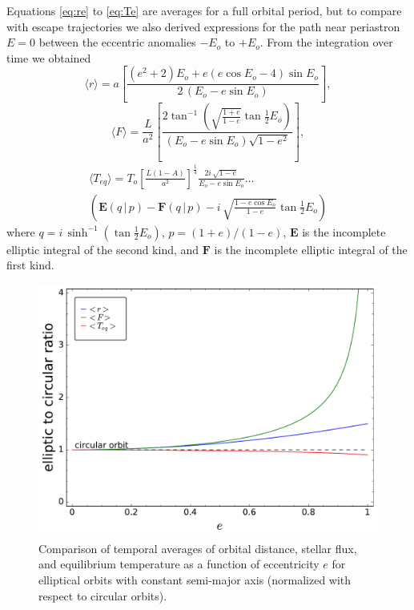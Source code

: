 \documentclass[a4paper,fleqn,usenatbib]{mnras}
\begin{document}
Equations \ref{eq:re} to \ref{eq:Te} are averages for a full orbital period, but to compare with escape trajectories we also derived expressions for the path near periastron $E=0$ between the eccentric anomalies $-E_o$ to $+E_o$. From the integration over time we obtained
\begin{equation} \label{eq:re2}
\langle r \rangle = a \left[ \frac{{{\left(e^{2} + 2\right)} E_o} + {e\left(e \cos{E_o} - 4\right)} \sin{E_o}}{2 \, {\left(E_o - e\sin{E_o}\right)}} \right],
\end{equation}
\begin{equation} \label{eq:Fe2}
\langle F \rangle = \frac{L}{a^2} \left[ \frac{2 \tan^{-1}\left(\sqrt{\frac{1 + e}{1 - e}} \tan{\frac{1}{2} E_o}\right)}{ {\left(E_o - e \sin{E_o} \right)}\sqrt{1-e^{2}}} \right],
\end{equation}
\begin{multline} \label{eq:Te2}
\langle T_{eq} \rangle = T_o \left[\frac{L {\left(1-A\right)}}{a^{2}}\right]^{\frac{1}{4}} \frac{2 i \,  \sqrt{1-e}}{ E_o - e \sin{E_o} } \ldots \\
\left(\mathbf{E} \left(q \,\big|\,p \right) - \mathbf{F} \left(q \,\big|\,p\right) -i \, \sqrt{\frac{1- e \cos{E_o}}{1 - e}} \tan{\frac{1}{2} E_o} \right)
\end{multline}
where $q = i \, \sinh^{-1}(\tan{\frac{1}{2} E_o})$, $p=(1+e)/(1-e)$, $\mathbf{E}$ is the incomplete elliptic integral of the second kind, and $\mathbf{F}$ is the incomplete elliptic integral of the first kind.
\begin{figure}
\includegraphics[width=\columnwidth]{f2.pdf}
\caption{Comparison of temporal averages of orbital distance, stellar flux, and equilibrium temperature as a function of eccentricity $e$ for elliptical orbits with constant semi-major axis (normalized with respect to circular orbits).}
\label{fig2}
\end{figure}
\end{document}
